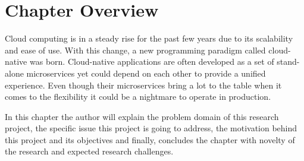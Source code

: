 \section{Chapter Overview}


Cloud computing is in a steady rise for the past few years due to its scalability and ease of use. With this change, a new programming paradigm called cloud-native was born. Cloud-native applications are often developed as a set of stand-alone microservices yet could depend on each other to provide a unified experience. Even though their microservices bring a lot to the table when it comes to the flexibility it could be a nightmare to operate in production.

In this chapter the author will explain the problem domain of this research project, the specific issue this project is going to address, the motivation behind this project and its objectives and finally, concludes the chapter with novelty of the research and expected research challenges.